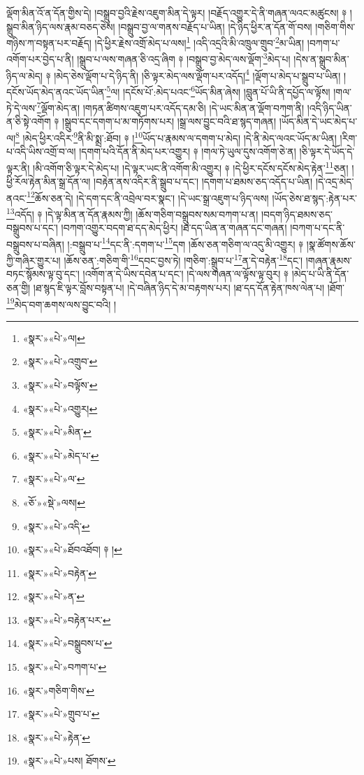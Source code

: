 ལྡོག་མིན་འོ་ན་དོན་གྱིས་དེ། །བསྒྲུབ་བྱའི་རྗེས་འཇུག་མིན་དེ་ལྟར། །བརྗོད་འགྱུར་དེ་ནི་གཞན་ལའང་མཚུངས། ༈ །སྒྲུབ་མིན་ཉིད་ལས་རྣམ་བཅད་ཅེས། །བསྒྲུབ་བྱ་ལ་གནས་བརྗོད་པ་ཡིན། །དེ་ཉིད་ཕྱིར་ན་དོན་གོ་བས། །གཅིག་གིས་གཉིས་ཀ་བསྟན་པར་བརྗོད། །དེ་ཕྱིར་རྗེས་འགྲོ་མེད་པ་ལས།\footnote{«སྣར་»«པེ་»ལ།} །འདི་འདྲའི་མི་འཁྲུལ་གྲུབ་\footnote{«སྣར་»«པེ་»འགྲུབ་}མ་ཡིན། །བཀག་པ་འགོག་པར་བྱེད་པ་ནི། །སྒྲུབ་པ་ལས་གཞན་ཅི་འདྲ་ཞིག ༈ །བསྒྲུབ་བྱ་མེད་ལས་ལྡོག་\footnote{«སྣར་»«པེ་»བལྟོས་}མེད་པ། །དེས་ན་སྒྲུབ་མིན་ཉིད་ལ་མེད། ༈ །མེད་ཅེས་ལྡོག་པ་དེ་ཉིད་ནི། །ཅི་ལྟར་མེད་ལས་ལྡོག་པར་འདོད།\footnote{«སྣར་»«པེ་»འགྱུར།} །ལྡོག་པ་མེད་པ་སྒྲུབ་པ་ཡིན། །དངོས་ཡོད་མེད་ནའང་ཡོད་ཡིན་\footnote{«སྣར་»«པེ་»མིན་}ལ། །དངོས་པོ་:མེད་པའང་\footnote{«སྣར་»«པེ་»མེད་པ་}ཡོད་མིན་ཞེས། །བླུན་པོ་ཡི་ནི་དཔྱོད་ལ་ལྟོས། །གལ་ཏེ་དེ་ལས་\footnote{«སྣར་»«པེ་»ལ་}ལྡོག་མེད་ན། །གཏན་ཚིགས་འཇུག་པར་འདོད་དམ་ཅི། །དེ་ཡང་མིན་ན་ལྡོག་བཀག་ནི། །འདི་ཉིད་ཡིན་ན་ཅི་སྟེ་འགོག ༈ །སྒྲུབ་དང་དགག་པ་མ་གཏོགས་པར། །སྒྲ་ལས་བྱུང་བའི་ཐ་སྙད་གཞན། །ཡོད་མིན་དེ་ཡང་མེད་པ་ལ།\footnote{«ཅོ་»«སྡེ་»ལས།} །མེད་ཕྱིར་འདིར་\footnote{«སྣར་»«པེ་»འདི་}ནི་མི་སྨྲ་:ཐོབ། ༈ །\footnote{«སྣར་»«པེ་»ཐོབའཐོབ། ༈ །}ཡོད་པ་རྣམས་ལ་དགག་པ་མེད། །དེ་ནི་མེད་ལའང་ཡོད་མ་ཡིན། །རིག་པ་འདི་ཡིས་འགྲོ་བ་ལ། །དགག་པའི་དོན་ནི་མེད་པར་འགྱུར། ༈ །གལ་ཏེ་ཡུལ་དུས་འགོག་ཅེ་ན། །ཅི་ལྟར་དེ་ཡོད་དེ་ལྟར་ནི། །མི་འགོག་ཅི་ལྟར་དེ་མེད་པ། །དེ་ལྟར་ཡང་ནི་འགོག་མི་འགྱུར། ༈ །དེ་ཕྱིར་དངོས་དངོས་མེད་རྟེན་\footnote{«སྣར་»«པེ་»བརྟེན་}ཅན། །ཕྱི་རོལ་རྟེན་མིན་སྒྲ་དོན་ལ། །བརྟེན་ནས་འདིར་ནི་སྒྲུབ་པ་དང་། །དགག་པ་ཐམས་ཅད་འདོད་པ་ཡིན། །དེ་འདྲ་མེད་ནའང་\footnote{«སྣར་»«པེ་»ན་}ཆོས་ཅན་དེ། །དེ་དག་དང་ནི་འབྲེལ་བར་སྣང་། །དེ་ཡང་སྒྲ་འཇུག་པ་ཉིད་ལས། །ཡོད་ཅེས་ཐ་སྙད་:རྟེན་པར་\footnote{«སྣར་»«པེ་»བརྟེན་པར་}འདོད། ༈ །དེ་ལྟ་མིན་ན་དོན་རྣམས་ཀྱི། །ཆོས་གཅིག་བསྒྲུབས་སམ་བཀག་པ་ན། །བདག་ཉིད་ཐམས་ཅད་བསྒྲུབས་པ་དང་། །བཀག་འགྱུར་བདག་ཐ་དད་མེད་ཕྱིར། །ཐ་དད་ཡིན་ན་གཞན་དང་གཞན། །བཀག་པ་དང་ནི་བསྒྲུབས་པ་བཞིན། །:བསྒྲུབ་པ་\footnote{«སྣར་»«པེ་»བསྒྲུབས་པ་}དང་ནི་:དགག་པ་\footnote{«སྣར་»«པེ་»བཀག་པ་}དག །ཆོས་ཅན་གཅིག་ལ་འདུ་མི་འགྱུར། ༈ །སྣ་ཚོགས་ཆོས་ཀྱི་གཞིར་གྱུར་པ། །ཆོས་ཅན་:གཅིག་གི་\footnote{«སྣར་»གཅིག་གིས་}དབང་བྱས་ཏེ། །གཅིག་:སྒྲུབ་པ་\footnote{«སྣར་»«པེ་»གྲུབ་པ་}ན་དེ་བརྟེན་\footnote{«སྣར་»«པེ་»རྟེན་}དང་། །གཞན་རྣམས་བཏང་སྙོམས་ལྟ་བུ་དང་། །འགོག་ན་དེ་ཡིས་དབེན་པ་དང་། །དེ་ལས་གཞན་ལ་ལྟོས་ལྟ་བུར། ༈ །མེད་པ་ཡི་ནི་དོན་ཅན་གྱི། །ཐ་སྙད་ཇི་ལྟར་བློས་བསྟན་པ། །དེ་བཞིན་ཉིད་དེ་མ་བརྟགས་པར། །ཐ་དད་དོན་རྟེན་ཁས་ལེན་པ། །ཐོག་\footnote{«སྣར་»«པེ་»པས། ཐོགས་}མེད་བག་ཆགས་ལས་བྱུང་བའི། །
